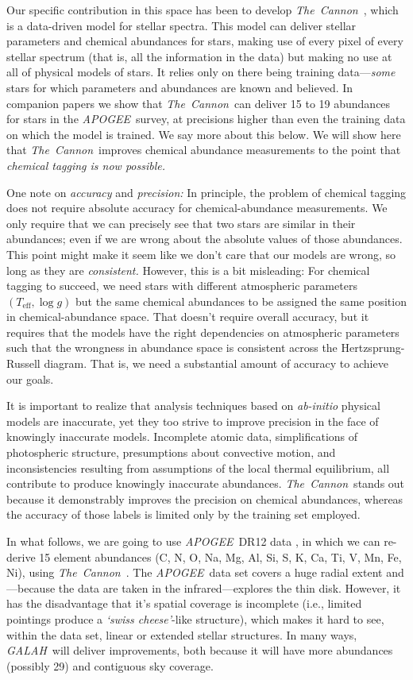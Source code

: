 \documentclass[12pt, letterpaper, preprint]{aastex}
\newcommand{\acronym}[1]{{\small{#1}}}
\newcommand{\project}[1]{\textsl{#1}}
\newcommand{\apogee}{\project{\acronym{APOGEE}}}
\newcommand{\galah}{\project{\acronym{GALAH}}}
\newcommand{\thecannon}{\project{The~Cannon}}
\newcommand{\foreign}[1]{\textsl{#1}}
\newcommand{\teff}{T_{\mathrm{eff}}}
\newcommand{\logg}{\log g}
\begin{document}
Our specific contribution in this space has been to develop
\thecannon\ \citep{thecannon, ages}, which is a data-driven model for
stellar spectra.
This model can deliver stellar parameters and chemical abundances for
stars, making use of every pixel of every stellar spectrum (that is,
all the information in the data) but making no use at all of physical
models of stars.
It relies only on there being training data---\emph{some} stars for
which parameters and abundances are known and believed.
In companion papers \citep{casey16, ness16} we show that
\thecannon\ can deliver 15 to 19 abundances for stars in the
\apogee\ survey, at precisions higher than even the training data on
which the model is trained.
We say more about this below.
We will show here that \thecannon\ improves chemical abundance measurements
to the point that \emph{chemical tagging is now possible.}

One note on \emph{accuracy} and \emph{precision:}
In principle, the problem of chemical tagging does not require
absolute accuracy for chemical-abundance measurements.
We only require that we can precisely see that two stars are similar
in their abundances; even if we are wrong about the absolute values of
those abundances.
This point might make it seem like we don't care that our models are
wrong, so long as they are \emph{consistent.}
However, this is a bit misleading:
For chemical tagging to succeed, we need stars with different
atmospheric parameters $(\teff, \logg)$ but the same chemical
abundances to be assigned the same position in chemical-abundance
space.
That doesn't require overall accuracy, but it requires that the models
have the right dependencies on atmospheric parameters such that the
wrongness in abundance space is consistent across the Hertzsprung-Russell diagram.
That is, we need a substantial amount of accuracy to achieve our goals.

It is important to realize that analysis techniques based on \foreign{ab-initio}
physical models are inaccurate, yet they too strive to improve precision
in the face of knowingly inaccurate models.  Incomplete atomic data, 
simplifications of photospheric structure, presumptions about convective
motion, and inconsistencies resulting from assumptions of the local thermal
equilibrium, all contribute to produce knowingly inaccurate abundances.
\thecannon\ stands out because it demonstrably improves the precision on
chemical abundances, whereas the accuracy of those labels is limited only
by the training set employed.

In what follows, we are going to use \apogee\ \acronym{DR12} data \citep{dr12}, in
which we can re-derive 15 element abundances (C, N, O, Na, Mg, Al, Si,
S, K, Ca, Ti, V, Mn, Fe, Ni), using \thecannon\ \citep{thecannon}.
The \apogee\ data set covers a huge radial extent and---because the
data are taken in the infrared---explores the thin disk.
However, it has the disadvantage that it's spatial coverage is incomplete
(i.e., limited pointings produce a \foreign{`swiss cheese'}-like structure),
which makes it hard to see, within the data set, linear or
extended stellar structures.
In many ways, \galah\ will deliver improvements, both because it will
have more abundances (possibly 29) and contiguous sky coverage.
\end{document}

